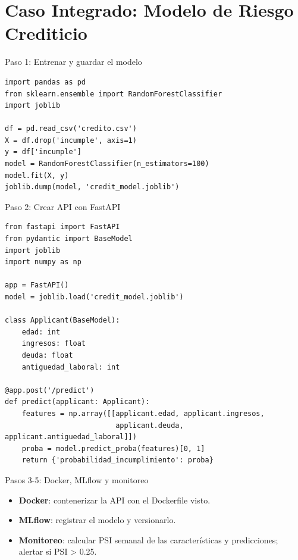 \documentclass[aspectratio=169, 10pt, xcolor=table]{beamer}
\begin{document}
\section{Caso Integrado: Modelo de Riesgo Crediticio}

\begin{frame}{Paso 1: Entrenar y guardar el modelo}
    \begin{lstlisting}
import pandas as pd
from sklearn.ensemble import RandomForestClassifier
import joblib

df = pd.read_csv('credito.csv')
X = df.drop('incumple', axis=1)
y = df['incumple']
model = RandomForestClassifier(n_estimators=100)
model.fit(X, y)
joblib.dump(model, 'credit_model.joblib')
    \end{lstlisting}
\end{frame}

\begin{frame}[fragile]{Paso 2: Crear API con FastAPI}
    \begin{lstlisting}
from fastapi import FastAPI
from pydantic import BaseModel
import joblib
import numpy as np

app = FastAPI()
model = joblib.load('credit_model.joblib')

class Applicant(BaseModel):
    edad: int
    ingresos: float
    deuda: float
    antiguedad_laboral: int

@app.post('/predict')
def predict(applicant: Applicant):
    features = np.array([[applicant.edad, applicant.ingresos,
                          applicant.deuda, applicant.antiguedad_laboral]])
    proba = model.predict_proba(features)[0, 1]
    return {'probabilidad_incumplimiento': proba}
    \end{lstlisting}
\end{frame}

\begin{frame}{Pasos 3-5: Docker, MLflow y monitoreo}
    \begin{itemize}
        \item \textbf{Docker}: contenerizar la API con el Dockerfile visto.
        \item \textbf{MLflow}: registrar el modelo y versionarlo.
        \item \textbf{Monitoreo}: calcular PSI semanal de las características y predicciones; alertar si PSI > 0.25.
    \end{itemize}
\end{frame}
\end{document}
